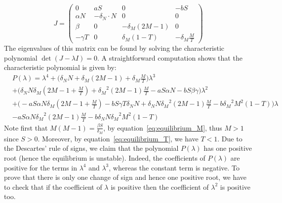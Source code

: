 \documentclass[a4paper, 12pt]{article}
\providecommand{\DIFaddtex}[1]{{\protect\color{blue} \sf #1}} %
\providecommand{\DIFaddbegin}{} %
\providecommand{\DIFaddend}{} %
\providecommand{\DIFdelbegin}{} %
\providecommand{\DIFdelend}{} %
\providecommand{\DIFadd}[1]{\texorpdfstring{\DIFaddtex{#1}}{#1}} %
\begin{document}
\[
J = \DIFdelbegin %
\DIFdelend \DIFaddbegin \begin{pmatrix}
0 & aS & 0 & -bS \\
\alpha N &  - \delta_N \cdot N & 0 & 0 \\
\beta & 0 & -\delta_M (2M-1) & 0 \\
-\gamma T & 0 & \delta_M (1-T) & - \delta_M\frac{M}{T} 
\end{pmatrix}\DIFaddend 
\]
The eigenvalues of this matrix can be found by solving the characteristic polynomial $\det(J - \lambda I) = 0$. A straightforward computation shows that the characteristic polynomial is given by:
\begin{eqnarray*}
&P(\lambda) = \lambda^4 + \Big(\delta_N N + \delta_M (2M-1) + \delta_M \frac{M}{T}\Big) \lambda^3 \\
&+ \Big(\delta_N N \delta_M(2M-1 + \frac{M}{T}) + {\delta_M}^2 (2M-1)\frac{M}{T} -a S \alpha N - b S \beta \gamma \Big) \lambda^2 \\
&+ \Big(- a S \alpha N \delta_M (2M-1+\frac{M}{T})  - b S\gamma T\delta_N N + \delta_N N {\delta_M}^2(2M-1)\frac{M}{T}- b{\delta_M}^2 M^2(1-T)\Big) \lambda \\
&- a S \alpha N {\delta_M}^2 (2M-1) \frac{M}{T} - b \delta_N N {\delta_M}^2 M^2 (1-T)
\end{eqnarray*}
\DIFaddbegin \DIFadd{Note first that $M(M-1) = \frac{\beta S}{\delta_M}$, by equation~\eqref{eq:equilibrium_M}, thus  $M >1$ since $S > 0$. 
Moreover, by equation~\eqref{eq:equilibrium_T}, we have $T < 1$.
}\DIFaddend Due to the Descartes' rule of signs, we claim that the polynomial $P(\lambda)$ has one positive root (hence the equilibrium is unstable). Indeed, the coefficients of $P(\lambda)$ are positive for the terms in 
$\lambda^4$ and $\lambda^3$, whereas the constant term is negative. To prove that there is only one change of sign and hence one positive root, we have to check that if the coefficient of $\lambda$ is positive then the coefficient of 
$\lambda^2$ is positive too. 
\end{document}
